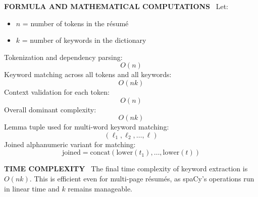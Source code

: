\documentclass[12pt]{article}
\renewcommand{\paragraph}[1]{\noindent\textbf{\MakeUppercase{#1}}\ }
\begin{document}
\paragraph{FORMULA AND MATHEMATICAL COMPUTATIONS}
Let:
\begin{itemize}
  \item $n$ = number of tokens in the résumé
  \item $k$ = number of keywords in the dictionary
\end{itemize}
Tokenization and dependency parsing:
\[
O(n)
\]
Keyword matching across all tokens and all keywords:
\[
O(nk)
\]
Context validation for each token:
\[
O(n)
\]
Overall dominant complexity:
\[
O(nk)
\]
Lemma tuple used for multi-word keyword matching:
\[
(\ell_1, \ell_2, \ldots, \ell)
\]
Joined alphanumeric variant for matching:
\[
\text{joined} = \text{concat}(\text{lower}(t_1), \ldots, \text{lower}(t))
\]

\paragraph{TIME COMPLEXITY}
The final time complexity of keyword extraction is $O(nk)$. This is efficient even for multi-page résumés, as spaCy's operations run in linear time and $k$ remains manageable.
\end{document}
